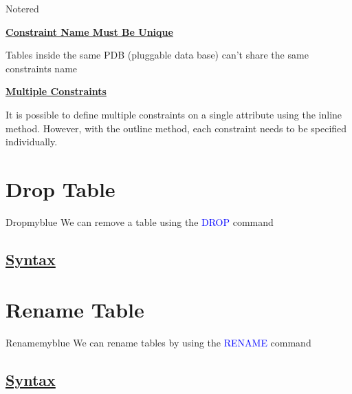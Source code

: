 \vspace{0.35cm}
\begin{prettyBox}{Note}{red}

    \textbf{\underline{Constraint Name Must Be Unique}}

\vspace{0.15cm}
Tables inside the same PDB (pluggable data base) can't share the same constraints name

\vspace{0.25cm}
\textbf{\underline{Multiple Constraints}}

\vspace{0.15cm}
It is possible to define multiple constraints on a single attribute using the inline method. 
However, with the outline method, each constraint needs to be specified individually.

\end{prettyBox}

\vspace{0.35cm}
\section{Drop Table}
\begin{prettyBox}{Drop}{myblue}
    We can remove a table using the \textcolor{blue}{DROP} command
\end{prettyBox}

\newpage
\subsection*{\underline{Syntax}}



\vspace{0.35cm}
\section{Rename Table}

\begin{prettyBox}{Rename}{myblue}
    We can rename tables by using the \textcolor{blue}{RENAME} command 
\end{prettyBox}

\subsection*{\underline{Syntax}}



